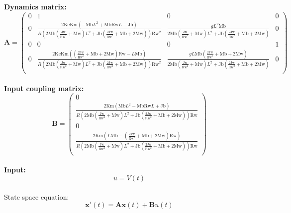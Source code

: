 \documentclass[a4paper , 12pt]{article}
\begin{document}
\textbf{Dynamics matrix:}
$$
\textbf{A}=\left(
\begin{array}{cccc}
 0 & 1 & 0 & 0 \\
 0 & \frac{2 \text{Ke} \text{Km} \left(-\text{Mb} L^2+\text{Mb}
   \text{Rw} L-\text{Jb}\right)}{R \left(2 \text{Mb}
   \left(\frac{\text{Jw}}{\text{Rw}^2}+\text{Mw}\right)
   L^2+\text{Jb} \left(\frac{2 \text{Jw}}{\text{Rw}^2}+\text{Mb}+2
   \text{Mw}\right)\right) \text{Rw}^2} & \frac{g L^2 \text{Mb}}{2
   \text{Mb} \left(\frac{\text{Jw}}{\text{Rw}^2}+\text{Mw}\right)
   L^2+\text{Jb} \left(\frac{2 \text{Jw}}{\text{Rw}^2}+\text{Mb}+2
   \text{Mw}\right)} & 0 \\
 0 & 0 & 0 & 1 \\
 0 & \frac{2 \text{Ke} \text{Km} \left(\left(\frac{2
   \text{Jw}}{\text{Rw}^2}+\text{Mb}+2 \text{Mw}\right)
   \text{Rw}-L \text{Mb}\right)}{R \left(2 \text{Mb}
   \left(\frac{\text{Jw}}{\text{Rw}^2}+\text{Mw}\right)
   L^2+\text{Jb} \left(\frac{2 \text{Jw}}{\text{Rw}^2}+\text{Mb}+2
   \text{Mw}\right)\right) \text{Rw}^2} & \frac{g L \text{Mb}
   \left(\frac{2 \text{Jw}}{\text{Rw}^2}+\text{Mb}+2
   \text{Mw}\right)}{2 \text{Mb}
   \left(\frac{\text{Jw}}{\text{Rw}^2}+\text{Mw}\right)
   L^2+\text{Jb} \left(\frac{2 \text{Jw}}{\text{Rw}^2}+\text{Mb}+2
   \text{Mw}\right)} & 0 \\
\end{array}
\right)
$$
\\
\textbf{Input coupling matrix:}
$$
\textbf{B}=\left(
\begin{array}{c}
 0 \\
 \frac{2 \text{Km} \left(\text{Mb} L^2-\text{Mb} \text{Rw}
   L+\text{Jb}\right)}{R \left(2 \text{Mb}
   \left(\frac{\text{Jw}}{\text{Rw}^2}+\text{Mw}\right)
   L^2+\text{Jb} \left(\frac{2 \text{Jw}}{\text{Rw}^2}+\text{Mb}+2
   \text{Mw}\right)\right) \text{Rw}} \\
 0 \\
 \frac{2 \text{Km} \left(L \text{Mb}-\left(\frac{2
   \text{Jw}}{\text{Rw}^2}+\text{Mb}+2 \text{Mw}\right)
   \text{Rw}\right)}{R \left(2 \text{Mb}
   \left(\frac{\text{Jw}}{\text{Rw}^2}+\text{Mw}\right)
   L^2+\text{Jb} \left(\frac{2 \text{Jw}}{\text{Rw}^2}+\text{Mb}+2
   \text{Mw}\right)\right) \text{Rw}} \\
\end{array}
\right)
$$
\\
\textbf{Input:}
$$
u= V(t)
$$
\\ State space equation:
$$
\textbf{x}'(t)=\textbf{A}\textbf{x}(t) + \textbf{B}u(t)
$$
\end{document}
